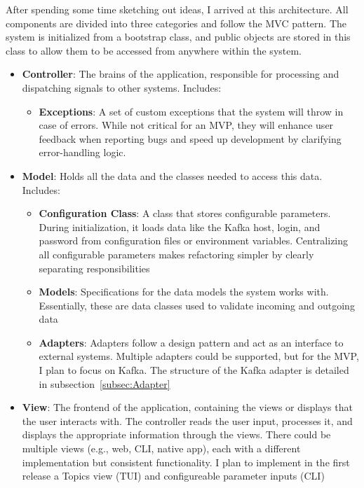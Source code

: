 \documentclass[10pt , a4paper]{report}
\begin{document}
After spending some time sketching out ideas, I arrived at this architecture. All components are divided into three categories and follow the MVC pattern. The system is initialized from a bootstrap class, and public objects are stored in this class to allow them to be accessed from anywhere within the system.

\begin{itemize}
  \item \textbf{Controller}: The brains of the application, responsible for processing and dispatching signals to other systems. Includes:
    \begin{itemize}
      \item \textbf{Exceptions}: A set of custom exceptions that the system will throw in case of errors. While not critical for an MVP, they will enhance user feedback when reporting bugs and speed up development by clarifying error-handling logic.
    \end{itemize}

  \item \textbf{Model}: Holds all the data and the classes needed to access this data. Includes:
    \begin{itemize}
      \item \textbf{Configuration Class}: A class that stores configurable parameters. During initialization, it loads data like the Kafka host, login, and password from configuration files or environment variables. Centralizing all configurable parameters makes refactoring simpler by clearly separating responsibilities
      \item \textbf{Models}: Specifications for the data models the system works with. Essentially, these are data classes used to validate incoming and outgoing data
      \item \textbf{Adapters}: Adapters follow a design pattern and act as an interface to external systems. Multiple adapters could be supported, but for the MVP, I plan to focus on Kafka. The structure of the Kafka adapter is detailed in subsection~\ref{subsec:Adapter}
    \end{itemize}

  \item \textbf{View}: The frontend of the application, containing the views or displays that the user interacts with. The controller reads the user input, processes it, and displays the appropriate information through the views. There could be multiple views (e.g., web, CLI, native app), each with a different implementation but consistent functionality. I plan to implement in the first release a Topics view (TUI) and configureable parameter inputs (CLI)
\end{itemize}
\end{document}
